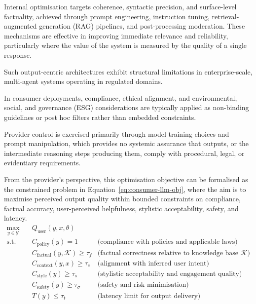 \documentclass[oneside,10pt]{swissi}
\begin{document}
Internal optimisation targets coherence, syntactic precision, and surface-level factuality, achieved through prompt engineering, instruction tuning, retrieval-augmented generation (RAG) pipelines, and post-processing moderation.\cite{schulhoff2024prompt,longpre2023flan,ouyang2022instruct,lewis2020rag,openai_moderation_docs} These mechanisms are effective in improving immediate relevance and reliability, particularly where the value of the system is measured by the quality of a single response.\cite{lewis2020rag,ouyang2022instruct}

Such output-centric architectures exhibit structural limitations in enterprise-scale, multi-agent systems operating in regulated domains.\cite{nist_ai_rmf_2023}

In consumer deployments, compliance, ethical alignment, and environmental, social, and governance (ESG) considerations are typically applied as non-binding guidelines or post hoc filters rather than embedded constraints.\cite{nist_ai_rmf_2023}

Provider control is exercised primarily through model training choices and prompt manipulation, which provides no systemic assurance that outputs, or the intermediate reasoning steps producing them, comply with procedural, legal, or evidentiary requirements.\cite{eu_ai_act_2024,nist_ai_rmf_2023}

From the provider’s perspective, this optimisation objective can be formalised as the constrained problem in Equation~\eqref{eq:consumer-llm-obj}, where the aim is to maximise perceived output quality within bounded constraints on compliance, factual accuracy, user-perceived helpfulness, stylistic acceptability, safety, and latency.
\begin{align}
\max_{y \in \mathcal{Y}} \quad & Q_{\text{user}}(y, x, \theta) \label{eq:consumer-llm-obj} \\
\text{s.t.} \quad
& C_{\text{policy}}(y) = 1 & \text{(compliance with policies and applicable laws)} \nonumber \\
& C_{\text{factual}}(y, \mathcal{K}) \geq \tau_f & \text{(factual correctness relative to knowledge base $\mathcal{K}$)} \nonumber \\
& C_{\text{context}}(y, x) \geq \tau_c & \text{(alignment with inferred user intent)} \nonumber \\
& C_{\text{style}}(y) \geq \tau_s & \text{(stylistic acceptability and engagement quality)} \nonumber \\
& C_{\text{safety}}(y) \geq \tau_{\sigma} & \text{(safety and risk minimisation)} \nonumber \\
& T(y) \leq \tau_t & \text{(latency limit for output delivery)} \nonumber
\end{align}
\end{document}
